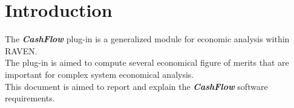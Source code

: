 \section{Introduction}
The \textbf{\textit{CashFlow}} plug-in is a generalized module for economic analysis within RAVEN.
\\The plug-in is aimed to compute several economical figure of merits that are important for complex
system economical analysis.
\\This document is aimed to report and explain the  \textbf{\textit{CashFlow}} software requirements.
